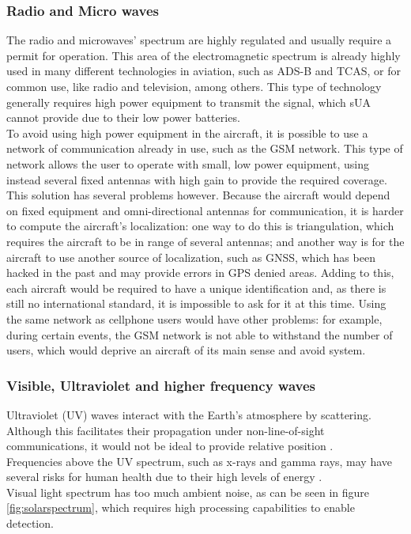 \subsubsection{Radio and Micro waves}
The radio and microwaves' spectrum are highly regulated and usually require a permit for operation. This area of the electromagnetic spectrum is already highly used in many different technologies in aviation, such as ADS-B and TCAS, or for common use, like radio and television, among others. This type of technology generally requires high power equipment to transmit the signal, which sUA cannot provide due to their low power batteries.\\
To avoid using high power equipment in the aircraft, it is possible to use a network of communication already in use, such as the GSM network. This type of network allows the user to operate with small, low power equipment, using instead several fixed antennas with high gain to provide the required coverage. This solution has several problems however. Because the aircraft would depend on fixed equipment and omni-directional antennas for communication, it is harder to compute the aircraft's localization: one way to do this is triangulation, which requires the aircraft to be in range of several antennas; and another way is for the aircraft to use another source of localization, such as GNSS, which has been hacked in the past \citep{Emspak2011} \citep{BBCNewsTechnology2012} and may provide errors in GPS denied areas. Adding to this, each aircraft would be required to have a unique identification and, as there is still no international standard, it is impossible to ask for it at this time. Using the same network as cellphone users would have other problems: for example, during certain events, the GSM network is not able to withstand the number of users, which would deprive an aircraft of its main sense and avoid system.\\
\subsubsection{Visible, Ultraviolet and higher frequency waves}
Ultraviolet (UV) waves interact with the Earth's atmosphere by scattering. Although this facilitates their propagation under non-line-of-sight communications, it would not be ideal to provide relative position \citep{Cruz}.\\
Frequencies above the UV spectrum, such as x-rays and gamma rays, may have several risks for human health due to their high levels of energy \citep{Waltz2008}. \\
Visual light spectrum has too much ambient noise, as can be seen in figure \ref{fig:solarspectrum}, which requires high processing capabilities to enable detection.\\
